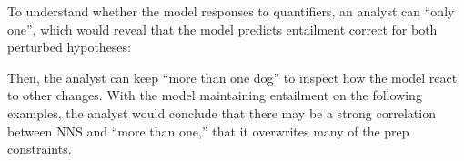 To understand whether the model responses to quantifiers, an analyst can \BLANK ``only one'', which would reveal that the model predicts entailment correct for both perturbed hypotheses:


Then, the analyst can keep ``more than one dog'' to inspect how the model react to other changes. 
With the model maintaining entailment on the following examples, the analyst would conclude that there may be a strong correlation between NNS and ``more than one,'' that it overwrites many of the prep constraints.


